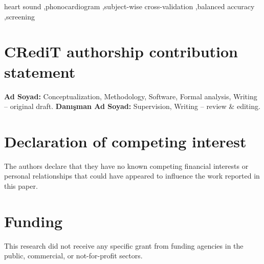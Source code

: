 \documentclass[preprint,12pt]{elsarticle}   %
\begin{document}
\begin{frontmatter}

\begin{keyword}   %
heart sound \sep phonocardiogram \sep subject-wise cross-validation \sep balanced accuracy \sep screening
\end{keyword}

\end{frontmatter}




\section*{CRediT authorship contribution statement}
\textbf{Ad Soyad:} Conceptualization, Methodology, Software, Formal analysis, Writing -- original draft.
\textbf{Danışman Ad Soyad:} Supervision, Writing -- review \& editing.

\section*{Declaration of competing interest}
The authors declare that they have no known competing financial interests or personal
relationships that could have appeared to influence the work reported in this paper.

\section*{Funding}
This research did not receive any specific grant from funding agencies in the public,
commercial, or not-for-profit sectors.
\end{document}
